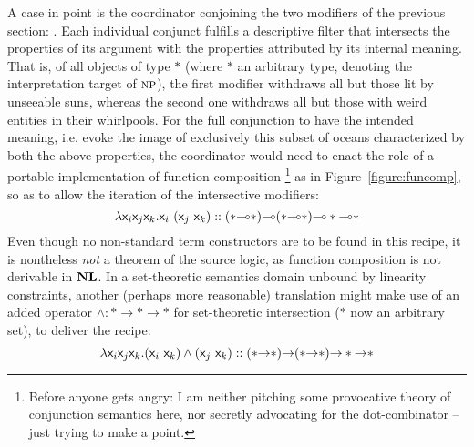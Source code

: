 A case in point is the coordinator  conjoining the two modifiers of the previous section: .
Each individual conjunct fulfills a descriptive filter that intersects the properties of its argument with the properties attributed by its internal meaning.
That is, of all objects of type $*$ (where $*$ an arbitrary type, denoting the interpretation target of $\normalfont\textsc{np}$), the first modifier withdraws all but those lit by unseeable suns, whereas the second one withdraws all but those with weird entities in their whirlpools.
For the full conjunction to have the intended meaning, i.e. evoke the image of exclusively this subset of oceans characterized by both the above properties, the coordinator would need to enact the role of a portable implementation of function composition%
	\footnote{Before anyone gets angry: I am neither pitching some provocative theory of conjunction semantics here,  nor secretly advocating for the dot-combinator -- just trying to make a point.} 
as in Figure~\ref{figure:funcomp}, so as to allow the iteration of the intersective modifiers:
\begin{equation}\label{equation:funcomp}
\lam \smallterm{\vari\varj\vark.\vari~(\varj~\vark)} :: (*\li *)\li(*\li *)\li * \li *
\end{equation}
Even though no non-standard term constructors are to be found in this recipe, it is nontheless \textit{not} a theorem of the source logic, as function composition is not derivable in $\textbf{NL}$.
In a set-theoretic semantics domain unbound by linearity constraints, another (perhaps more reasonable) translation might make use of an added operator $\wedge : * \to * \to *$ for set-theoretic intersection ($*$ now an arbitrary set), to deliver the recipe:
\begin{equation}
\lam \smallterm{\vari\varj\vark.(\vari~\vark)\wedge(\varj~\vark)} :: (*\ii *)\ii(*\ii *)\ii * \ii *
\end{equation}


